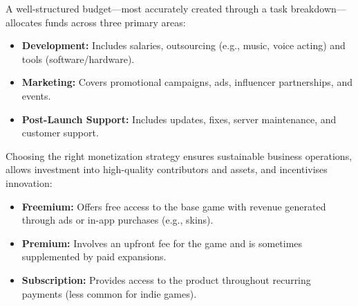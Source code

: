 A well-structured budget---most accurately created through a task breakdown\cite{linkedin_budget}---allocates funds across three primary areas:
\begin{itemize}
	\item \textbf{Development:} Includes salaries, outsourcing (e.g., music, voice acting) and tools (software/hardware)\cite{eduonix_costs}.
	\item \textbf{Marketing:} Covers promotional campaigns, ads, influencer partnerships, and events\cite{eduonix_costs}.
	\item \textbf{Post-Launch Support:} Includes updates, fixes, server maintenance, and customer support\cite{eduonix_costs}.
\end{itemize}

Choosing the right monetization strategy ensures sustainable business operations, allows investment into high-quality contributors and assets, and incentivises innovation:
\begin{itemize}
	\item \textbf{Freemium:} Offers free access to the base game with revenue generated through ads or in-app purchases (e.g., skins)\cite{hubka_game-monetization}.
	\item \textbf{Premium:} Involves an upfront fee for the game and is sometimes supplemented by paid expansions\cite{hubka_game-monetization}.
	\item \textbf{Subscription:} Provides access to the product throughout recurring payments (less common for indie games)\cite{hubka_game-monetization}.
\end{itemize}

